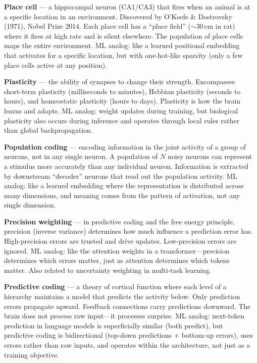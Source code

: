 \documentclass[11pt,a4paper]{article}
\begin{document}
\textbf{Place cell} --- a hippocampal neuron (CA1/CA3) that fires when an animal is at a specific location in an environment. Discovered by O'Keefe \& Dostrovsky (1971), Nobel Prize 2014. Each place cell has a ``place field'' (${\sim}30$\,cm in rat) where it fires at high rate and is silent elsewhere. The population of place cells maps the entire environment. ML analog: like a learned positional embedding that activates for a specific location, but with one-hot-like sparsity (only a few place cells active at any position).

\textbf{Plasticity} --- the ability of synapses to change their strength. Encompasses short-term plasticity (milliseconds to minutes), Hebbian plasticity (seconds to hours), and homeostatic plasticity (hours to days). Plasticity is how the brain learns and adapts. ML analog: weight updates during training, but biological plasticity also occurs during inference and operates through local rules rather than global backpropagation.

\textbf{Population coding} --- encoding information in the joint activity of a group of neurons, not in any single neuron. A population of $N$ noisy neurons can represent a stimulus more accurately than any individual neuron. Information is extracted by downstream ``decoder'' neurons that read out the population activity. ML analog: like a learned embedding where the representation is distributed across many dimensions, and meaning comes from the pattern of activation, not any single dimension.

\textbf{Precision weighting} --- in predictive coding and the free energy principle, precision (inverse variance) determines how much influence a prediction error has. High-precision errors are trusted and drive updates. Low-precision errors are ignored. ML analog: like the attention weights in a transformer---precision determines which errors matter, just as attention determines which tokens matter. Also related to uncertainty weighting in multi-task learning.

\textbf{Predictive coding} --- a theory of cortical function where each level of a hierarchy maintains a model that predicts the activity below. Only prediction errors propagate upward. Feedback connections carry predictions downward. The brain does not process raw input---it processes surprise. ML analog: next-token prediction in language models is superficially similar (both predict), but predictive coding is bidirectional (top-down predictions + bottom-up errors), uses errors rather than raw inputs, and operates within the architecture, not just as a training objective.
\end{document}
